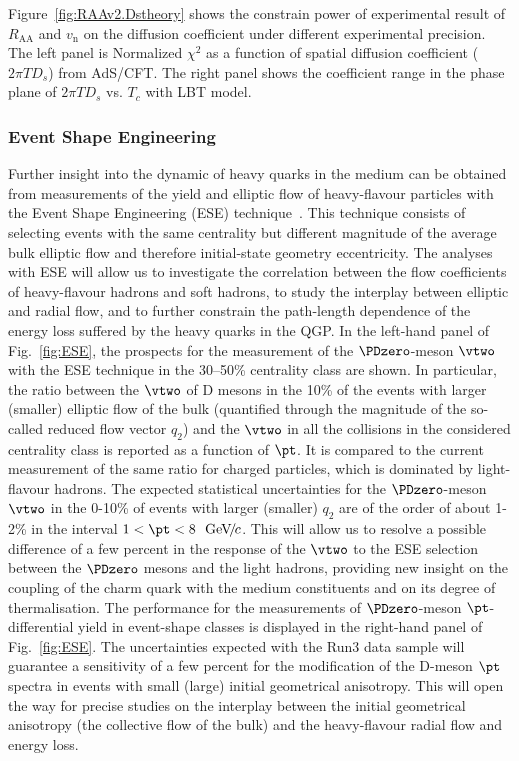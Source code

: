 Figure~\ref{fig:RAAv2.Dstheory} shows the constrain power of experimental result of $R_{\mathrm{AA}}$ and $v_{\mathrm{n}}$ on the diffusion coefficient under different experimental precision. The left panel is Normalized $\chi^{2}$ as a function of spatial diffusion coefficient ($2\pi TD_{s}$) from AdS/CFT. The right panel shows the coefficient range in the phase plane of $2\pi TD_{s}$ vs. $T_{c}$ with LBT model.

\subsubsection{Event Shape Engineering}

Further insight into the dynamic of heavy quarks in the medium can be
obtained from measurements of the yield and elliptic flow of heavy-flavour
particles with the Event Shape Engineering (ESE) 
technique~\cite{Schukraft:2012ah}.
This technique consists of selecting events with the same centrality but 
different magnitude of the average bulk elliptic flow and therefore initial-state geometry eccentricity.
The analyses with ESE will allow us to investigate the correlation between 
the flow coefficients of heavy-flavour hadrons and soft hadrons, to study the interplay between elliptic and radial flow, and to further constrain the path-length dependence of the energy loss suffered by the heavy quarks in the QGP.
In the left-hand panel of Fig.~\ref{fig:ESE}, the prospects for the measurement of the ${\PDzero}$-meson $\vtwo$ with the ESE technique in the 30--50\% centrality class are shown.
In particular, the ratio between the $\vtwo$ of D mesons in the 10\% of the events with larger (smaller) elliptic flow of the bulk (quantified through the magnitude of the so-called reduced flow vector $q_2$) and the $\vtwo$ in all the collisions in the considered centrality class is reported as a function of $\pt$.
It is compared to the current measurement of the same ratio for charged 
particles, which is dominated by light-flavour hadrons.
The expected statistical uncertainties for the $\PDzero$-meson $\vtwo$ in the 0-10\% of events with larger (smaller) $q_2$ are of the order of about 1-2\% in the interval $1 < \pt < 8~\UGeVc$. This will allow us to resolve a possible difference of a few percent in the response of the $\vtwo$ to the ESE selection between the $\PDzero$ mesons and the light hadrons, providing new insight on the coupling of the charm quark with the medium constituents and on its degree of thermalisation. 
The performance for the measurements of $\PDzero$-meson 
$\pt$-differential yield in event-shape classes is displayed in the right-hand panel of Fig.~\ref{fig:ESE}.
The uncertainties expected with the Run3 data sample will guarantee a sensitivity of a few percent for the modification of 
the D-meson $\pt$ spectra in events with small (large) initial 
geometrical anisotropy.
This will open the way for precise studies on the interplay between the initial geometrical anisotropy (the collective flow of the bulk) and the heavy-flavour radial flow and energy loss.

